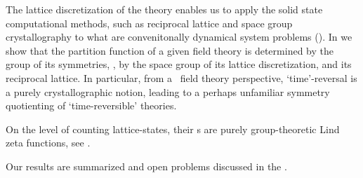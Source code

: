 The lattice discretization of the theory enables us to apply the
solid state computational methods, such as reciprocal lattice and
space group crystallography to what are convenitonally dynamical
system problems ().
In  we show that the partition function of a
given field theory is determined by the group of its symmetries, \ie,
by the space group of its lattice discretization,
and its reciprocal lattice.
In particular, from a \spt\ field theory perspective, `time'-reversal is
a purely crystallographic notion, leading to a perhaps unfamiliar
symmetry quotienting of `time-reversible' theories.

On the level of counting lattice-states, their {\tzeta}s are purely
group-theoretic Lind zeta functions, see .

Our results are summarized and open problems discussed in the
.
